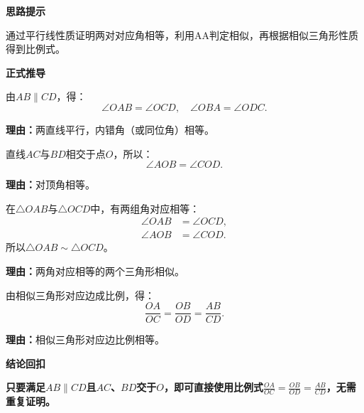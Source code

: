 \begin{proofbox}
	\textbf{\textcolor{CProof}{思路提示}}
	\par 通过平行线性质证明两对对应角相等，利用AA判定相似，再根据相似三角形性质得到比例式。

	\medskip
	\textbf{\textcolor{CProof}{正式推导}}
	\begin{description}[style=nextline, leftmargin=2.8em, labelsep=0.5em, itemsep=0.55em]
		\item[\textbf{步骤一（平行得角相等）：}]
		      由$AB\parallel CD$，得：
		      \[
			      \angle OAB = \angle OCD,\quad \angle OBA = \angle ODC.
		      \]
		      \par\textbf{理由：}两直线平行，内错角（或同位角）相等。
		\item[\textbf{步骤二（对顶角相等）：}]
		      直线$AC$与$BD$相交于点$O$，所以：
		      \[
			      \angle AOB = \angle COD.
		      \]
		      \par\textbf{理由：}对顶角相等。
		\item[\textbf{步骤三（AA证相似）：}]
		      在$\triangle OAB$与$\triangle OCD$中，有两组角对应相等：
		      \[
			      \begin{aligned}
				      \angle OAB & = \angle OCD, \\
				      \angle AOB & = \angle COD.
			      \end{aligned}
		      \]
		      所以$\triangle OAB\sim\triangle OCD$。
		      \par\textbf{理由：}两角对应相等的两个三角形相似。
		\item[\textbf{步骤四（对应边成比例）：}]
		      由相似三角形对应边成比例，得：
		      \[
			      \frac{OA}{OC}=\frac{OB}{OD}=\frac{AB}{CD}.
		      \]
		      \par\textbf{理由：}相似三角形对应边比例相等。
	\end{description}

	\medskip
	\textbf{\textcolor{CProof}{结论回扣}}
	\par\textbf{只要满足$AB\parallel CD$且$AC$、$BD$交于$O$，即可直接使用比例式$\frac{OA}{OC}=\frac{OB}{OD}=\frac{AB}{CD}$，无需重复证明。}
\end{proofbox}